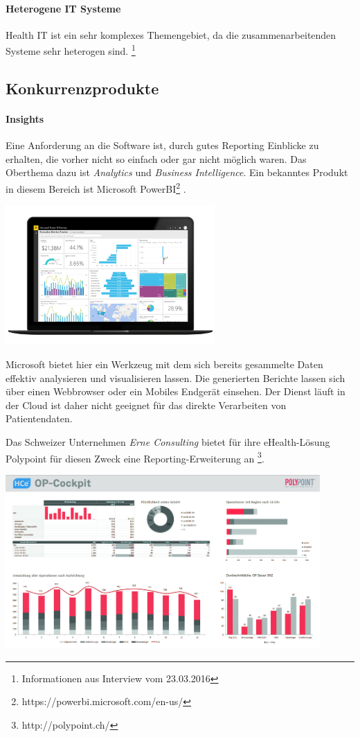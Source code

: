 \documentclass[a4paper]{scrreprt}
\begin{document}
\paragraph{Heterogene IT Systeme} Health IT ist ein sehr komplexes Themengebiet, da die zusammenarbeitenden Systeme sehr heterogen sind. \footnote{Informationen aus Interview vom 23.03.2016}



\subsection{Konkurrenzprodukte}
\paragraph{Insights} Eine Anforderung an die Software ist, durch gutes Reporting Einblicke zu erhalten, die vorher nicht so einfach oder gar nicht möglich waren. Das Oberthema dazu ist \textit{Analytics} und \textit{Business Intelligence}. Ein bekanntes Produkt in diesem Bereich ist Microsoft PowerBI\footnote{https://powerbi.microsoft.com/en-us/} .

\includegraphics[width=0.6\textwidth]{img/research_ms-powerbi.png}

Microsoft bietet hier ein Werkzeug mit dem sich bereits gesammelte Daten effektiv analysieren und visualisieren lassen. Die generierten Berichte lassen sich über einen Webbrowser oder ein Mobiles Endgerät einsehen. Der Dienst läuft in der Cloud ist daher nicht geeignet für das direkte Verarbeiten von Patientendaten.

\bigskip

Das Schweizer Unternehmen \textit{Erne Consulting} bietet für ihre eHealth-Lösung Polypoint für diesen Zweck eine Reporting-Erweiterung an \footnote{http://polypoint.ch/}.

\includegraphics[width=0.9\textwidth]{img/research_polypoint_op-cockpit.jpg}
\end{document}
